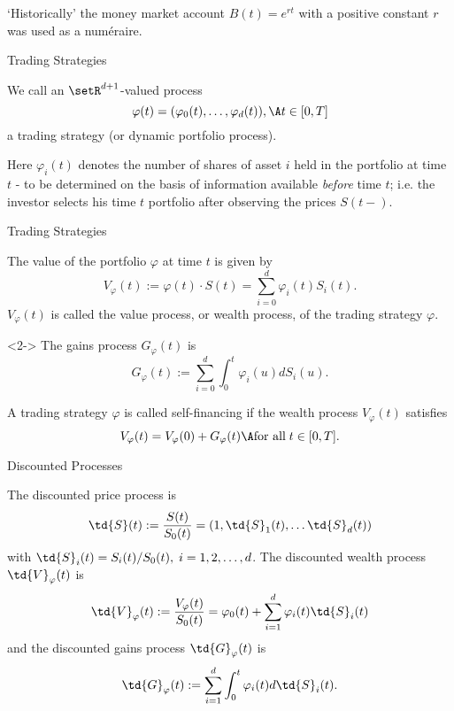 	
\lq {Historically}' the money market account $B(t)=e^{rt}$ with a
positive constant $r$ was used as a
num\'{e}raire.





{ Trading Strategies}







	We call an $\setR^{d+1}$-valued process
$$
\varphi(t) = (\varphi_0(t), \ldots, \varphi_d(t)), \A t \in [0,T]
$$
a trading strategy (or dynamic portfolio process).


	
Here $\varphi_i(t)$ denotes the number of shares of asset $i$ held
in the portfolio at time $t$ - to be determined on the basis of
information available {\it before} time $t$; i.e. the investor
selects his time $t$ portfolio after observing the prices $S(t-)$.





{ Trading Strategies}






	The value of the portfolio $\varphi$ at time $t$ is
given by
$$
V_\varphi(t) :=  \varphi(t) \cdot S(t) = \sum_{i=0}^d \varphi_i(t)
S_i(t).
$$
$V_\varphi(t)$ is called the value process, or wealth process, of
the trading strategy $\varphi$.\

	<2-> The gains process
$G_\varphi(t)$ is
$$
G_\varphi(t) := \sum_{i=0}^d \int_0^t \varphi_i(u) dS_i(u).
$$


	A trading strategy $\varphi$ is called self-financing if
the wealth process $V_\varphi(t)$ satisfies
$$
V_\varphi(t) = V_\varphi(0) + G_\varphi(t)\A \mbox{for all}\; t\in
[0,T].
$$





{ Discounted Processes}

The discounted price process is
$$
\td{S}(t) := \frac{S(t)}{S_0(t)} = (1, \td{S}_1(t), \ldots
\td{S}_d(t))
$$
with $\td{S}_i(t) = S_i(t)/S_0(t),\; i=1,2, \ldots, d$. The
discounted wealth process $\td{V}_\varphi(t)$ is
$$
\td{V}_\varphi(t):= \frac{V_\varphi(t)}{S_0(t)} = \varphi_0(t) +
\sum_{i=1}^d \varphi_i(t) \td{S}_i(t)
$$
and the discounted gains process $\td{G}_\varphi(t)$ is
$$
\td{G}_\varphi(t) := \sum_{i=1}^d \int_0^t \varphi_i(t)
d\td{S}_i(t).
$$

